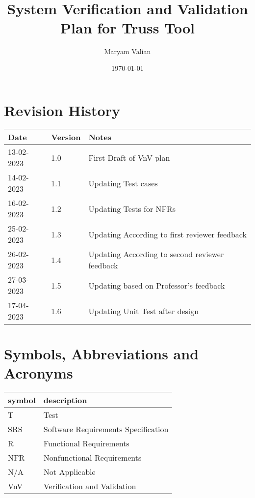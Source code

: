 \documentclass[12pt, titlepage]{article}
\begin{document}
\title{ System Verification and Validation Plan for Truss Tool} 
\author{Maryam Valian}
\date{\today}
	
\maketitle


\section{Revision History}

\begin{tabularx}{\textwidth}{p{3cm}p{2cm}X}
\toprule {\bf Date} & {\bf Version} & {\bf Notes}\\
\midrule
13-02-2023 & 1.0 & First Draft of VnV plan\\
14-02-2023 & 1.1& Updating Test cases   \\
16-02-2023 & 1.2& Updating Tests for NFRs   \\
25-02-2023 & 1.3& Updating According to first reviewer feedback   \\
26-02-2023 & 1.4& Updating According to second reviewer feedback   \\
27-03-2023 & 1.5& Updating based on Professor's feedback \\
17-04-2023 & 1.6& Updating Unit Test after design \\


\bottomrule
\end{tabularx}

\newpage

\tableofcontents

\newpage

\section{Symbols, Abbreviations and Acronyms}

\renewcommand{\arraystretch}{1.2}
\begin{tabular}{l l} 
  \toprule		
  \textbf{symbol} & \textbf{description}\\
  \midrule 
  T & Test\\
  SRS & Software Requirements Specification\\
  R & Functional Requirements\\
  NFR & Nonfunctional Requirements\\
  N/A & Not Applicable\\
  VnV & Verification and Validation\\
  
\bottomrule
\end{tabular}\\
\end{document}
